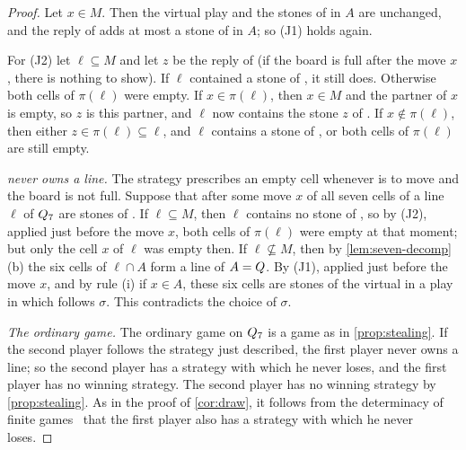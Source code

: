 \begin{proof}
Let $x\in M$. Then the virtual play and the stones of \Maker{} in $A$ are unchanged, and the reply of
\Breaker{} adds at most a stone of \Breaker{} in $A$; so (J1) holds again.

For (J2) let $\ell\subseteq M$ and let $z$ be the reply of \Breaker{} (if the board is full after the
move $x$, there is nothing to show). If $\ell$ contained a stone of \Breaker, it still does. Otherwise
both cells of $\pi(\ell)$ were empty. If $x\in\pi(\ell)$, then $x\in M$ and the partner of $x$ is empty,
so $z$ is this partner, and $\ell$ now contains the stone $z$ of \Breaker. If $x\notin\pi(\ell)$, then
either $z\in\pi(\ell)\subseteq\ell$, and $\ell$ contains a stone of \Breaker, or both cells of
$\pi(\ell)$ are still empty.

\smallskip\noindent\emph{\Maker{} never owns a line.} The strategy prescribes an empty cell whenever
\Breaker{} is to move and the board is not full. Suppose that after some move $x$ of \Maker{} all seven
cells of a line $\ell$ of $Q_7$ are stones of \Maker. If $\ell\subseteq M$, then $\ell$ contains no
stone of \Breaker, so by (J2), applied just before the move $x$, both cells of $\pi(\ell)$ were empty at
that moment; but only the cell $x$ of $\ell$ was empty then. If $\ell\not\subseteq M$, then by
\cref{lem:seven-decomp}\,(b) the six cells of $\ell\cap A$ form a line of $A=Q$. By (J1), applied just
before the move $x$, and by rule (i) if $x\in A$, these six cells are stones of the virtual \Maker{} in
a play in which \Breaker{} follows $\sigma$. This contradicts the choice of $\sigma$.

\smallskip\noindent\emph{The ordinary game.} The ordinary game on $Q_7$ is a game as in
\cref{prop:stealing}. If the second player follows the strategy just described, the first player never
owns a line; so the second player has a strategy with which he never loses, and the first player has no
winning strategy. The second player has no winning strategy by \cref{prop:stealing}. As in the proof of
\cref{cor:draw}, it follows from the determinacy of finite games~\cite{Zermelo1913} that the first
player also has a strategy with which he never loses.
\end{proof}

